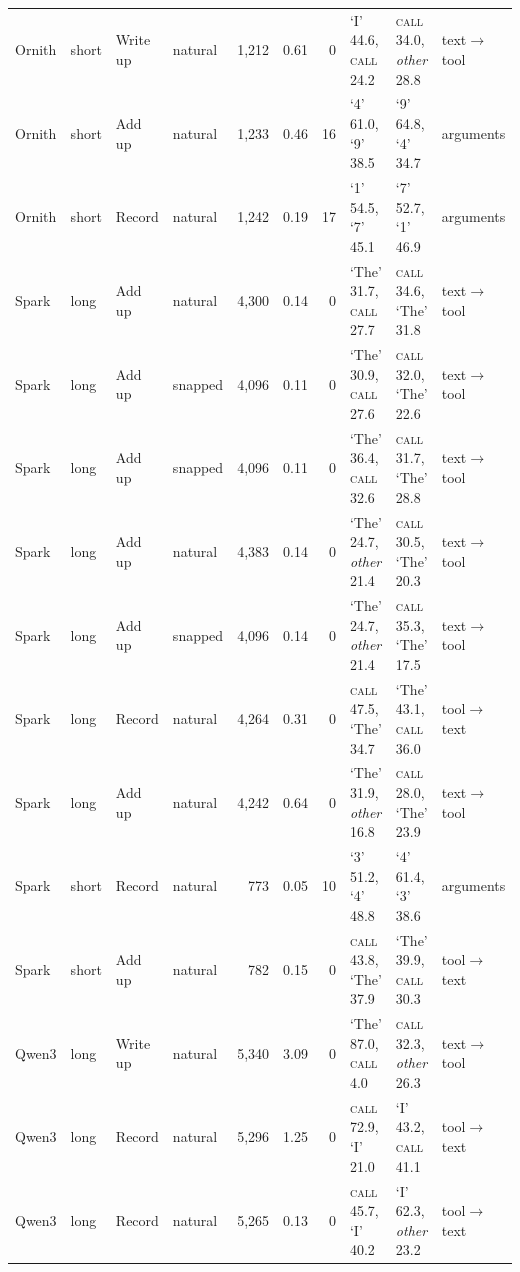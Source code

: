 \begin{table}[p]
\begin{tabular}{@{}llllrrrlll@{}}
Ornith & short & Write up & natural & 1{,}212 & 0.61 & 0 & `I' 44.6, \textsc{call} 24.2 & \textsc{call} 34.0, \textit{other} 28.8 & text$\to$tool \\
Ornith & short & Add up & natural & 1{,}233 & 0.46 & 16 & `4' 61.0, `9' 38.5 & `9' 64.8, `4' 34.7 & arguments \\
Ornith & short & Record & natural & 1{,}242 & 0.19 & 17 & `1' 54.5, `7' 45.1 & `7' 52.7, `1' 46.9 & arguments \\
Spark & long & Add up & natural & 4{,}300 & 0.14 & 0 & `The' 31.7, \textsc{call} 27.7 & \textsc{call} 34.6, `The' 31.8 & text$\to$tool \\
Spark & long & Add up & snapped & 4{,}096 & 0.11 & 0 & `The' 30.9, \textsc{call} 27.6 & \textsc{call} 32.0, `The' 22.6 & text$\to$tool \\
Spark & long & Add up & snapped & 4{,}096 & 0.11 & 0 & `The' 36.4, \textsc{call} 32.6 & \textsc{call} 31.7, `The' 28.8 & text$\to$tool \\
Spark & long & Add up & natural & 4{,}383 & 0.14 & 0 & `The' 24.7, \textit{other} 21.4 & \textsc{call} 30.5, `The' 20.3 & text$\to$tool \\
Spark & long & Add up & snapped & 4{,}096 & 0.14 & 0 & `The' 24.7, \textit{other} 21.4 & \textsc{call} 35.3, `The' 17.5 & text$\to$tool \\
Spark & long & Record & natural & 4{,}264 & 0.31 & 0 & \textsc{call} 47.5, `The' 34.7 & `The' 43.1, \textsc{call} 36.0 & tool$\to$text \\
Spark & long & Add up & natural & 4{,}242 & 0.64 & 0 & `The' 31.9, \textit{other} 16.8 & \textsc{call} 28.0, `The' 23.9 & text$\to$tool \\
Spark & short & Record & natural & 773 & 0.05 & 10 & `3' 51.2, `4' 48.8 & `4' 61.4, `3' 38.6 & arguments \\
Spark & short & Add up & natural & 782 & 0.15 & 0 & \textsc{call} 43.8, `The' 37.9 & `The' 39.9, \textsc{call} 30.3 & tool$\to$text \\
Qwen3 & long & Write up & natural & 5{,}340 & 3.09 & 0 & `The' 87.0, \textsc{call} 4.0 & \textsc{call} 32.3, \textit{other} 26.3 & text$\to$tool \\
Qwen3 & long & Record & natural & 5{,}296 & 1.25 & 0 & \textsc{call} 72.9, `I' 21.0 & `I' 43.2, \textsc{call} 41.1 & tool$\to$text \\
Qwen3 & long & Record & natural & 5{,}265 & 0.13 & 0 & \textsc{call} 45.7, `I' 40.2 & `I' 62.3, \textit{other} 23.2 & tool$\to$text \\

\end{tabular}
\end{table}
